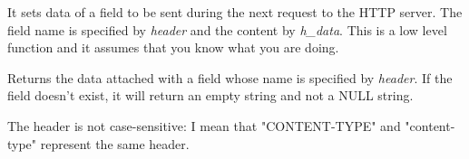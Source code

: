 


\label{wxhttpsetheader}


It sets data of a field to be sent during the next request to the HTTP server. The field
name is specified by {\it header} and the content by {\it h\_data}.
This is a low level function and it assumes that you know what you are doing.

\label{wxhttpgetheader}


Returns the data attached with a field whose name is specified by {\it header}.
If the field doesn't exist, it will return an empty string and not a NULL string.


The header is not case-sensitive: I mean that "CONTENT-TYPE" and "content-type" 
represent the same header.

